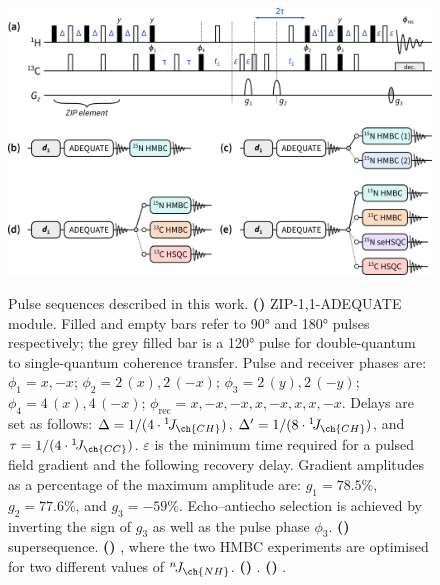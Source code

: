 \documentclass[a4paper,12pt]{article}
\newcommand{\carbon}{\ch{^{13}C}}
\newcommand{\nitrogen}{\ch{^{15}N}}
\newcommand{\onejch}{{}^1\!J_{\ch{CH}}}
\newcommand{\onejcc}{{}^1\!J_{\ch{CC}}}
\newcommand{\njnh}{{}^n\!J_{\ch{NH}}}
\begin{document}
\begin{refsection}
\begin{figure}[ht]
    \centering
    \includegraphics[width=\textwidth]{sequences.png}
    {\label{fig:sequences_adequate}}
    {\label{fig:sequences_ab}}
    {\label{fig:sequences_abb}}
    {\label{fig:sequences_abbs}}
    {\label{fig:sequences_abbss}}
    \caption{
        Pulse sequences described in this work.
        \textbf{()} ZIP-1,1-ADEQUATE module.
        Filled and empty bars refer to \ang{90} and \ang{180} pulses respectively; the grey filled bar is a \ang{120} pulse for \carbon{} double-quantum to single-quantum coherence transfer\autocite{Mareci1982JMR}.
        Pulse and receiver phases are: $\phi_1 = x, -x$; $\phi_2 = 2\,(x), 2\,(-x)$; $\phi_3 = 2\,(y), 2\,(-y)$; $\phi_4 = 4\,(x), 4\,(-x)$; $\phi_\text{rec} = x, -x, -x, x, -x, x, x, -x$.
        Delays are set as follows: $\Delta = 1 / (4 \cdot \onejch)$, $\Delta' = 1 / (8 \cdot \onejch)$, and $\tau = 1 / (4 \cdot \onejcc)$. $\varepsilon$ is the minimum time required for a pulsed field gradient and the following recovery delay.
        Gradient amplitudes as a percentage of the maximum amplitude are: $g_1 = 78.5\%$, $g_2 = 77.6\%$, and $g_3 = -59\%$.
        Echo--antiecho selection is achieved by inverting the sign of $g_3$ as well as the pulse phase $\phi_3$.
        \textbf{()}  supersequence.
        \textbf{()} , where the two \nitrogen{} HMBC experiments are optimised for two different values of $\njnh{}$.
        \textbf{()} .
        \textbf{()} .
    }
    \label{fig:sequences}
\end{figure}


\end{refsection}
\end{document}

